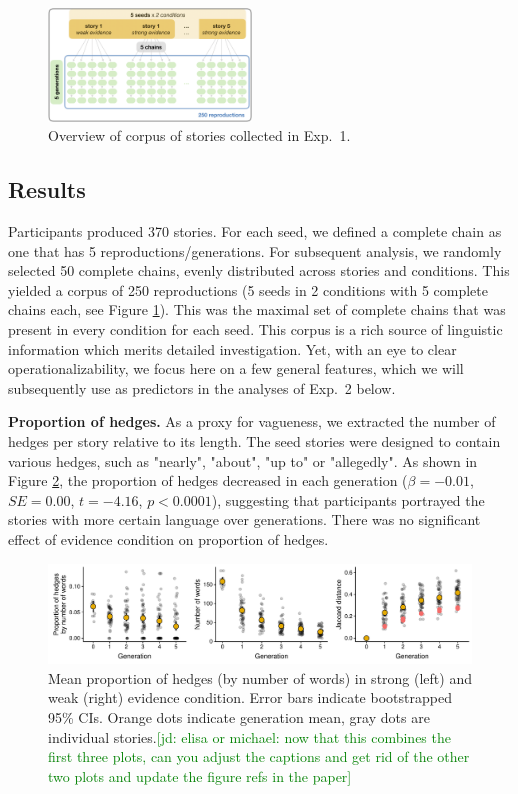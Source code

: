 \documentclass[10pt,letterpaper]{article}
\newcommand{\jd}[1]{\textcolor{Green}{[jd: #1]}}
\begin{document}
 \begin{figure}[]
	\includegraphics[width=0.48\textwidth]{pics/corpus_overview.png}
	\caption{Overview of corpus of stories collected in Exp.~1.} 
	\label{fig:design}
\end{figure}

\subsection{Results}

Participants produced 370 stories. For each seed, we defined a complete chain as one that has 5 reproductions/generations. For subsequent analysis, we randomly selected 50 complete chains, evenly distributed across stories and conditions. This yielded a corpus of 250 reproductions (5 seeds in 2 conditions with 5 complete chains each, see Figure \ref{fig:design}). This was the maximal set of complete chains that was present in every condition for each seed. This corpus is a rich source of linguistic information which merits detailed investigation. Yet, with an eye to clear operationalizability, we focus here on a few general features, which we will subsequently use as predictors in the analyses of Exp.~2 below.

\textbf{Proportion of hedges.} As a proxy for vagueness, we extracted the number of hedges per story relative to its length. The seed stories were designed to contain various hedges, such as "nearly", "about", "up to" or "allegedly". As shown in Figure \ref{fig:hedges}, the proportion of hedges decreased in each generation  ($\beta = -0.01$, $SE = 0.00$, $t = -4.16$, $p < 0.0001$), suggesting that participants portrayed the stories with more certain language over generations. There was no significant effect of evidence condition on proportion of hedges.

\begin{figure}[]
\centering
	\includegraphics[width=.85\textwidth]{pics/linmeasure_grid}
	\caption{Mean proportion of hedges (by number of words) in strong (left) and weak (right) evidence condition. Error bars indicate bootstrapped 95\% CIs. Orange dots indicate generation mean, gray dots are individual stories.\jd{elisa or michael: now that this combines the first three plots, can you adjust the captions and get rid of the other two plots and update the figure refs in the paper}} 
	\label{fig:hedges}
\end{figure}
\end{document}
